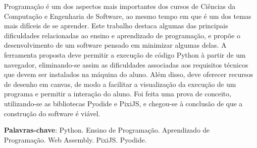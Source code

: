 \begin{resumo}
Programação é um dos aspectos mais importantes dos cursos de Ciências da Computação
e Engenharia de Software, ao mesmo tempo em que é um dos temas mais difíceis de se
aprender. Este trabalho destaca algumas das principais dificuldades relacionadas ao ensino e aprendizado de programação, e propõe o desenvolvimento de um software pensado
em minimizar algumas delas. A ferramenta proposta deve permitir a execução de código
Python à partir de um navegador, eliminando-se assim as dificuldades associadas aos requisitos técnicos que devem ser instalados na máquina do aluno. Além disso, deve oferecer
recursos de desenho em canvas, de modo a facilitar a visualização da execução de um programa e permitir a interação do aluno. Foi feita uma prova de conceito, utilizando-se as
bibliotecas Pyodide e PixiJS, e chegou-se à conclusão de que a construção do software é
viável.

 \vspace{\onelineskip}
    
 \noindent
 \textbf{Palavras-chave}:  Python. Ensino de Programação. Aprendizado de Programação. Web Assembly. PixiJS. Pyodide.
\end{resumo}
